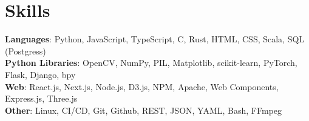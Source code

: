 \documentclass[letterpaper,11pt]{article}
\begin{document}
\section{Skills}
  \begin{itemize}[leftmargin=0.15in, label={}]
    \small{\item{
      \textbf{Languages}{:
      Python,
      JavaScript,
      TypeScript,
      C,
      Rust,
      HTML,
      CSS,
      Scala,
      SQL (Postgress)} \\
      \textbf{Python Libraries}{: 
      OpenCV,
      NumPy,
      PIL,
      Matplotlib,
      scikit-learn,
      PyTorch,
      Flask,
      Django,
      bpy} \\
      \textbf{Web}{: 
      React.js, 
      Next.js,
      Node.js,
      D3.js,
      NPM, 
      Apache,
      Web Components,
      Express.js,
      Three.js
      }
      \\
      \textbf{Other}{:
        Linux,
        CI/CD,
        Git, 
        Github,
        REST,
        JSON, 
        YAML,
        Bash,
        FFmpeg 
        }}}
      {\vspace{-5pt}}
  \end{itemize}
  
\end{document}
